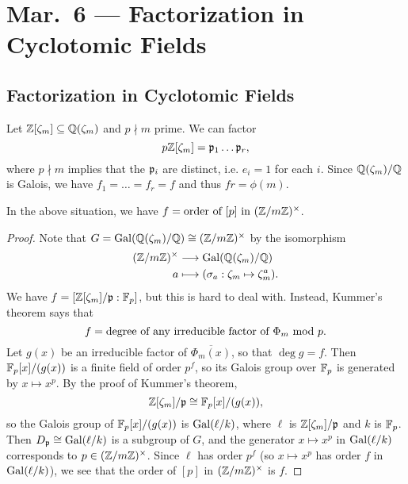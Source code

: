 \chapter{Mar.~6 --- Factorization in Cyclotomic Fields}

\section{Factorization in Cyclotomic Fields}

\begin{remark}
  Let $\mathbb{Z}[\zeta_m] \subseteq \mathbb{Q}(\zeta_m)$ and
  $p \nmid m$ prime. We can factor
  \[
    p \mathbb{Z}[\zeta_m] = \mathfrak{p}_1 \dots \mathfrak{p}_r,
  \]
  where $p \nmid m$ implies that the
  $\mathfrak{p}_i$ are distinct, i.e. $e_i = 1$ for each $i$.
  Since $\mathbb{Q}(\zeta_m) / \mathbb{Q}$ is Galois, we have
  $f_1 = \dots = f_r = f$ and thus
  $fr = \phi(m)$.
\end{remark}

\begin{prop}
  In the above situation, we have
  $f = \text{order of $[p]$ in $(\mathbb{Z} / m\mathbb{Z})^\times$}$.
\end{prop}

\begin{proof}
  Note that $G = \operatorname{Gal}(\mathbb{Q}(\zeta_m) / \mathbb{Q}) \cong (\mathbb{Z} / m\mathbb{Z})^\times$
  by the isomorphism
  \begin{align*}
    (\mathbb{Z} / m\mathbb{Z})^\times
    &\longrightarrow \operatorname{Gal}(\mathbb{Q}(\zeta_m) / \mathbb{Q}) \\
    a
    &\longmapsto
    (\sigma_a : \zeta_m \mapsto \zeta_m^a).
  \end{align*}
  We have $f = [\mathbb{Z}[\zeta_m] / \mathfrak{p} : \mathbb{F}_p]$, but this
  is hard to deal with. Instead, Kummer's theorem
  says that
  \[
    f = \text{degree of any irreducible factor of $\Phi_m \ {\mathrm{mod}\ p}$}.
  \]
  Let $g(x)$ be an irreducible factor of
  $\overline{\Phi_m(x)}$, so that $\deg g = f$.
  Then $\mathbb{F}_p[x] / (g(x))$ is a finite field of
  order $p^f$, so its Galois group over $\mathbb{F}_p$
  is generated by $x \mapsto x^p$. By the
  proof of Kummer's theorem,
  \[
    \mathbb{Z}[\zeta_m] / \mathfrak{p} \cong \mathbb{F}_p[x] / (g(x)),
  \]
  so the Galois group of
  $\mathbb{F}_p[x] / (g(x))$ is $\operatorname{Gal}(\ell / k)$, where
  $\ell$ is $\mathbb{Z}[\zeta_m] / \mathfrak{p}$ and $k$ is $\mathbb{F}_p$.
  Then $D_{\mathfrak{p}} \cong \operatorname{Gal}(\ell / k)$ is a subgroup
  of $G$, and the generator $x \mapsto x^p$ in
  $\operatorname{Gal}(\ell / k)$ corresponds to
  $p \in (\mathbb{Z} / m\mathbb{Z})^\times$. Since $\ell$ has
  order $p^f$ (so $x \mapsto x^p$ has order
  $f$ in $\operatorname{Gal}(\ell / k)$), we see that the order of
  $[p]$ in $(\mathbb{Z} / m\mathbb{Z})^\times$ is $f$.
\end{proof}

